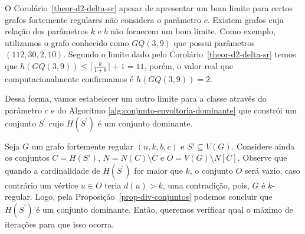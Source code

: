 O Corolário~\ref{theor-d2-delta-sr} apesar de apresentar um bom limite para certos grafos fortemente regulares não considera o parâmetro $c$. Existem grafos cuja relação dos parâmetros $k$ e $b$ não fornecem um bom limite. Como exemplo, utilizamos o grafo conhecido como $GQ(3,9)$ que possui parâmetros $(112,30,2,10)$. Segundo o limite dado pelo Corolário~\ref{theor-d2-delta-sr} temos que $h(GQ(3,9)) \leq \big\lceil \frac{k}{1+b} \big\rceil + 1=11$, porém, o valor real que computacionalmente confirmamos é $h(GQ(3,9))=2$. 

Dessa forma, vamos estabelecer um outro limite para a classe através do parâmetro $c$ e do Algoritmo \ref{alg:conjunto-envoltoria-dominante} que constrói um conjunto $S^\prime$ cujo $H(S^\prime)$ é um conjunto dominante.





Seja $G$ um grafo fortemente regular $(n,k,b,c)$ e $S' \subseteq V(G)$. Considere ainda os conjuntos $C=H(S')$, $N= N(C)\setminus C$ e $O=V(G)\setminus N[C]$. Observe que quando a cardinalidade de $H(S^\prime)$ for maior que $k$, o conjunto $O$ será vazio, caso contrário um vértice $u \in O$ teria $d(u) > k$, uma contradição, pois, $G$ é $k$-regular. Logo, pela Proposição~\ref{prop-div-conjuntos} podemos concluir que $H(S^\prime)$ é um conjunto dominante. Então, queremos verificar qual o máximo de iterações para que isso ocorra.

